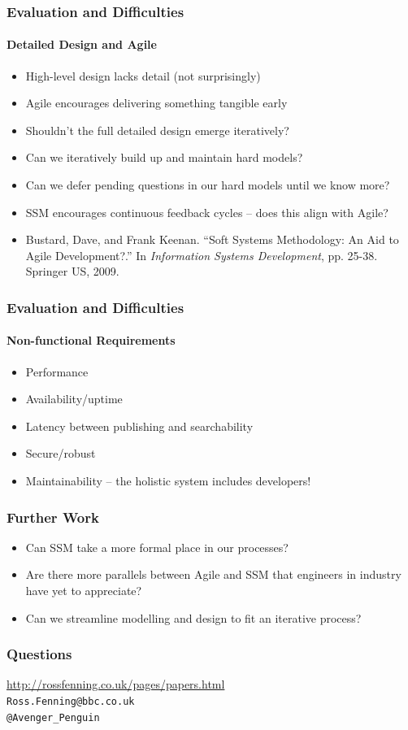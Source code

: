 \documentclass{beamer}
\begin{document}
\begin{frame}
  \frametitle{Evaluation and Difficulties}
  \framesubtitle{Detailed Design and Agile}
  \begin{itemize}
    \item High-level design lacks detail (not surprisingly)
    \item Agile encourages delivering something tangible early
    \item Shouldn't the full detailed design emerge iteratively?
    \item Can we iteratively build up and maintain hard models?
    \item Can we defer pending questions in our hard models until we know more?
    \item SSM encourages continuous feedback cycles -- does this align with Agile?
    \item Bustard, Dave, and Frank Keenan. ``Soft Systems Methodology: An Aid to Agile Development?.''
      In \emph{Information Systems Development}, pp. 25-38. Springer US, 2009.
  \end{itemize}
\end{frame}

\begin{frame}
  \frametitle{Evaluation and Difficulties}
  \framesubtitle{Non-functional Requirements}
  \begin{itemize}
    \item Performance
    \item Availability/uptime
    \item Latency between publishing and searchability
    \item Secure/robust
    \item Maintainability -- the holistic system includes developers!
  \end{itemize}
\end{frame}

\begin{frame}
  \frametitle{Further Work}
  \begin{itemize}
    \item Can SSM take a more formal place in our processes?
    \item Are there more parallels between Agile and SSM that engineers in industry have yet to appreciate?
    \item Can we streamline modelling and design to fit an iterative process?
  \end{itemize}
\end{frame}

\begin{frame}
  \frametitle{Questions}
  \begin{center}
    \url{http://rossfenning.co.uk/pages/papers.html}\\
    \texttt{Ross.Fenning@bbc.co.uk}\\
    \texttt{@Avenger\_Penguin}
  \end{center}
\end{frame}
\end{document}
